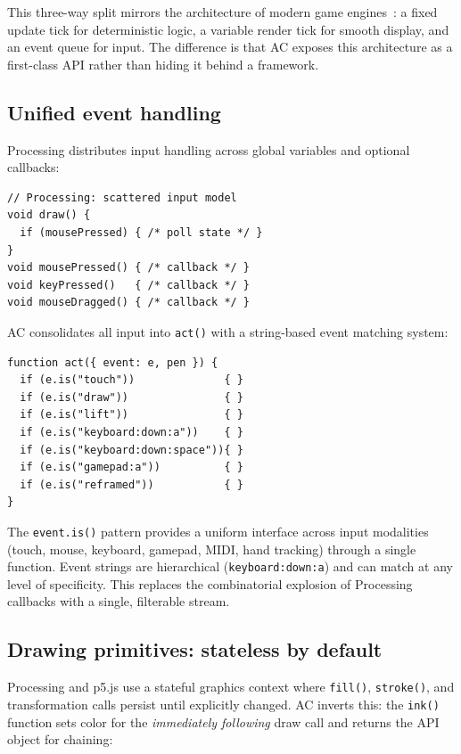\documentclass[10pt,letterpaper,twocolumn]{article}
\begin{document}
This three-way split mirrors the architecture of modern game engines~\citep{nystrom2014game}: a fixed update tick for deterministic logic, a variable render tick for smooth display, and an event queue for input. The difference is that AC exposes this architecture as a first-class API rather than hiding it behind a framework.

\subsection{Unified event handling}

Processing distributes input handling across global variables and optional callbacks:

\begin{lstlisting}[style=processingstyle]
// Processing: scattered input model
void draw() {
  if (mousePressed) { /* poll state */ }
}
void mousePressed() { /* callback */ }
void keyPressed()   { /* callback */ }
void mouseDragged() { /* callback */ }
\end{lstlisting}

AC consolidates all input into \texttt{act()} with a string-based event matching system:

\begin{lstlisting}[style=acjsstyle]
function act({ event: e, pen }) {
  if (e.is("touch"))              { }
  if (e.is("draw"))               { }
  if (e.is("lift"))               { }
  if (e.is("keyboard:down:a"))    { }
  if (e.is("keyboard:down:space")){ }
  if (e.is("gamepad:a"))          { }
  if (e.is("reframed"))           { }
}
\end{lstlisting}

The \texttt{event.is()} pattern provides a uniform interface across input modalities (touch, mouse, keyboard, gamepad, MIDI, hand tracking) through a single function. Event strings are hierarchical (\texttt{keyboard:down:a}) and can match at any level of specificity. This replaces the combinatorial explosion of Processing callbacks with a single, filterable stream.

\subsection{Drawing primitives: stateless by default}

Processing and p5.js use a stateful graphics context where \texttt{fill()}, \texttt{stroke()}, and transformation calls persist until explicitly changed. AC inverts this: the \texttt{ink()} function sets color for the \emph{immediately following} draw call and returns the API object for chaining:
\end{document}

